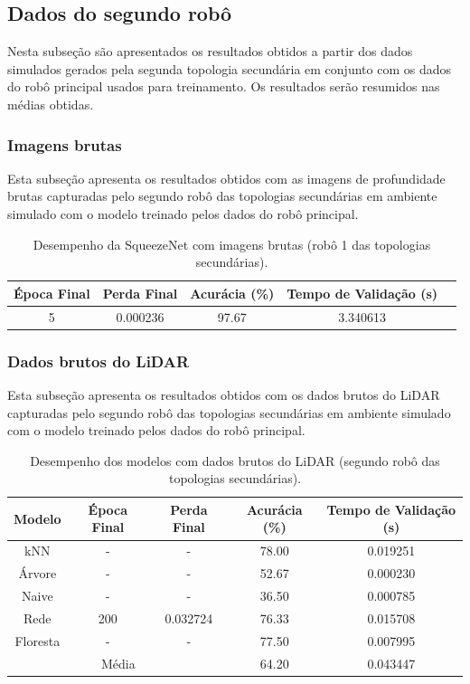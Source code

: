 \subsection{Dados do segundo robô}

Nesta subseção são apresentados os resultados obtidos a partir dos dados simulados gerados pela segunda topologia secundária em conjunto com os dados do robô principal usados para treinamento. Os resultados serão resumidos nas médias obtidas.

\subsubsection{Imagens brutas}

Esta subseção apresenta os resultados obtidos com as imagens de profundidade brutas
capturadas pelo segundo robô das topologias secundárias em ambiente simulado com o modelo treinado pelos dados do robô principal.


\begin{table}[H]
\caption{Desempenho da SqueezeNet com imagens brutas (robô 1 das topologias secundárias).}
\centering
\begin{tabular}{ccccc}
\hline
\textbf{Época Final} & \textbf{Perda Final} & \textbf{Acurácia (\%)} & \textbf{Tempo de Validação (s)}  \\
\hline
5 & 0.000236 & 97.67 & 3.340613 \\
\hline
\end{tabular}
\fonte{}
\label{tab:resultados_nn2_topo_secundarias}
\end{table}

\subsubsection{Dados brutos do LiDAR}

Esta subseção apresenta os resultados obtidos com os dados brutos do LiDAR capturadas pelo segundo robô das topologias secundárias em ambiente simulado com o modelo treinado pelos dados do robô principal.

\begin{table}[H]
\caption{Desempenho dos modelos com dados brutos do LiDAR (segundo robô das topologias secundárias).}
\centering
\begin{tabular}{ccccc}
\hline
\textbf{Modelo} & \textbf{Época Final} & \textbf{Perda Final} & \textbf{Acurácia (\%)} & \textbf{Tempo de Validação (s)}  \\
\hline
kNN      & - & - & 78.00 & 0.019251 \\
Árvore   & - & - & 52.67 & 0.000230 \\
Naive    & - & - & 36.50 & 0.000785 \\
Rede     & 200 & 0.032724 & 76.33 & 0.015708 \\
Floresta & - & - & 77.50 & 0.007995 \\
\hline
\multicolumn{3}{c}{Média} & 64.20 & 0.043447 \\
\hline
\end{tabular}
\fonte{}
\label{tab:modelos_lidar_bruto_robo2}
\end{table}

